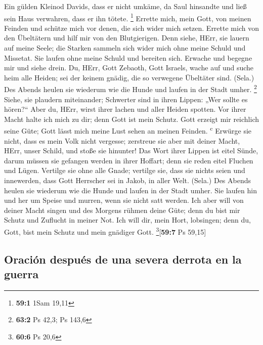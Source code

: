  Ein gülden Kleinod Davids, dass er nicht umkäme, da Saul
hinsandte und ließ sein Haus verwahren, dass er ihn tötete. \footnote{\textbf{59:1}
  1Sam 19,11}  Errette mich, mein Gott, von meinen Feinden
und schütze mich vor denen, die sich wider mich setzen. 
Errette mich von den Übeltätern und hilf mir von den Blutgierigen.
 Denn siehe, HErr, sie lauern auf meine Seele; die Starken
sammeln sich wider mich ohne meine Schuld und Missetat. 
Sie laufen ohne meine Schuld und bereiten sich. Erwache und begegne mir
und siehe drein.  Du, HErr, Gott Zebaoth, Gott Israels,
wache auf und suche heim alle Heiden; sei der keinem gnädig, die so
verwegene Übeltäter sind. (Sela.)  Des Abends heulen sie
wiederum wie die Hunde und laufen in der Stadt umher. \footnote{\textbf{63:2}
  Ps 42,3; Ps 143,6}  Siehe, sie plaudern miteinander;
Schwerter sind in ihren Lippen: „Wer sollte es hören?{}`` 
Aber du, HErr, wirst ihrer lachen und aller Heiden spotten.
 Vor ihrer Macht halte ich mich zu dir; denn Gott ist
mein Schutz.  Gott erzeigt mir reichlich seine Güte; Gott
lässt mich meine Lust sehen an meinen Feinden. \textsuperscript{c}
 Erwürge sie nicht, dass es mein Volk nicht vergesse;
zerstreue sie aber mit deiner Macht, HErr, unser Schild, und stoße sie
hinunter!  Das Wort ihrer Lippen ist eitel Sünde, darum
müssen sie gefangen werden in ihrer Hoffart; denn sie reden eitel
Fluchen und Lügen.  Vertilge sie ohne alle Gnade;
vertilge sie, dass sie nichts seien und innewerden, dass Gott Herrscher
sei in Jakob, in aller Welt. (Sela.)  Des Abends heulen
sie wiederum wie die Hunde und laufen in der Stadt umher.
 Sie laufen hin und her um Speise und murren, wenn sie
nicht satt werden.  Ich aber will von deiner Macht singen
und des Morgens rühmen deine Güte; denn du bist mir Schutz und Zuflucht
in meiner Not.  Ich will dir, mein Hort, lobsingen; denn
du, Gott, bist mein Schutz und mein gnädiger Gott.
\footnote{\textbf{60:6} Ps 20,6}{[}\textbf{59:7} Ps 59,15{]}

\hypertarget{oraciuxf3n-despuuxe9s-de-una-severa-derrota-en-la-guerra}{%
\subsection{Oración después de una severa derrota en la
guerra}\label{oraciuxf3n-despuuxe9s-de-una-severa-derrota-en-la-guerra}}

